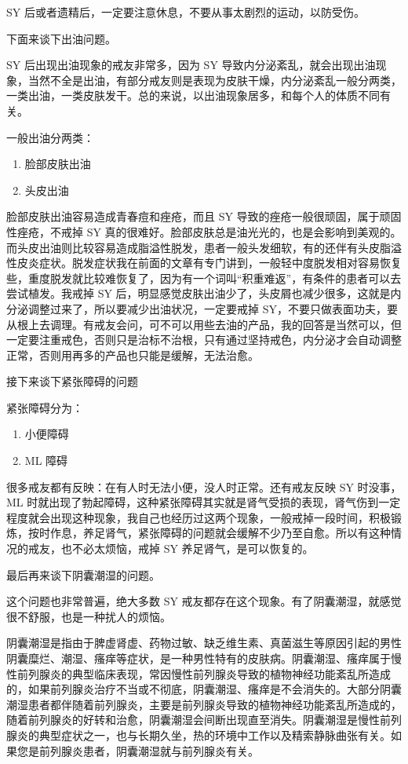 \documentclass{ctexart}
\begin{document}
SY 后或者遗精后，一定要注意休息，不要从事太剧烈的运动，以防受伤。

下面来谈下出油问题。

SY 后出现出油现象的戒友非常多，因为 SY 导致内分泌紊乱，就会出现出油现象，当然不全是出油，有部分戒友则是表现为皮肤干燥，内分泌紊乱一般分两类，一类出油，一类皮肤发干。总的来说，以出油现象居多，和每个人的体质不同有关。

一般出油分两类：

\begin{enumerate}
    \item 脸部皮肤出油
    \item 头皮出油
\end{enumerate}

脸部皮肤出油容易造成青春痘和痤疮，而且 SY 导致的痤疮一般很顽固，属于顽固性痤疮，不戒掉 SY 真的很难好。脸部皮肤总是油光光的，也是会影响到美观的。而头皮出油则比较容易造成脂溢性脱发，患者一般头发细软，有的还伴有头皮脂溢性皮炎症状。脱发症状我在前面的文章有专门讲到，一般轻中度脱发相对容易恢复些，重度脱发就比较难恢复了，因为有一个词叫“积重难返”，有条件的患者可以去尝试植发。我戒掉 SY 后，明显感觉皮肤出油少了，头皮屑也减少很多，这就是内分泌调整过来了，所以要减少出油状况，一定要戒掉 SY，不要只做表面功夫，要从根上去调理。有戒友会问，可不可以用些去油的产品，我的回答是当然可以，但一定要注重戒色，否则只是治标不治根，只有通过坚持戒色，内分泌才会自动调整正常，否则用再多的产品也只能是缓解，无法治愈。

接下来谈下紧张障碍的问题

紧张障碍分为：

\begin{enumerate}
    \item 小便障碍
    \item ML 障碍
\end{enumerate}

很多戒友都有反映：在有人时无法小便，没人时正常。还有戒友反映 SY 时没事，ML 时就出现了勃起障碍，这种紧张障碍其实就是肾气受损的表现，肾气伤到一定程度就会出现这种现象，我自己也经历过这两个现象，一般戒掉一段时间，积极锻炼，按时作息，养足肾气，紧张障碍的问题就会缓解不少乃至自愈。所以有这种情况的戒友，也不必太烦恼，戒掉 SY 养足肾气，是可以恢复的。

最后再来谈下阴囊潮湿的问题。

这个问题也非常普遍，绝大多数 SY 戒友都存在这个现象。有了阴囊潮湿，就感觉很不舒服，也是一种扰人的烦恼。

阴囊潮湿是指由于脾虚肾虚、药物过敏、缺乏维生素、真菌滋生等原因引起的男性阴囊糜烂、潮湿、瘙痒等症状，是一种男性特有的皮肤病。阴囊潮湿、瘙痒属于慢性前列腺炎的典型临床表现，常因慢性前列腺炎导致的植物神经功能紊乱所造成的，如果前列腺炎治疗不当或不彻底，阴囊潮湿、瘙痒是不会消失的。大部分阴囊潮湿患者都伴随着前列腺炎，主要是前列腺炎导致的植物神经功能紊乱所造成的，随着前列腺炎的好转和治愈，阴囊潮湿会间断出现直至消失。阴囊潮湿是慢性前列腺炎的典型症状之一，也与长期久坐，热的环境中工作以及精索静脉曲张有关。如果您是前列腺炎患者，阴囊潮湿就与前列腺炎有关。
\end{document}
